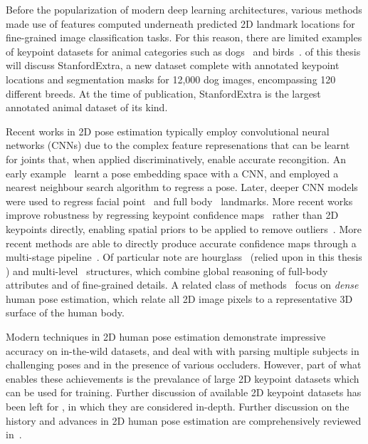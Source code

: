Before the popularization of modern deep learning architectures, various methods made use of features computed underneath predicted 2D landmark locations for fine-grained image classification tasks. For this reason, there are limited examples of keypoint datasets for animal categories such as dogs~\cite{liu2012dog} and birds~\cite{WelinderEtal2010}.  of this thesis will discuss StanfordExtra, a new dataset complete with annotated keypoint locations and segmentation masks for 12,000 dog images, encompassing 120 different breeds. At the time of publication, StanfordExtra is the largest annotated animal dataset of its kind. 

Recent works in 2D pose estimation typically employ convolutional neural networks (CNNs) due to the complex feature represenations that can be learnt for joints that, when applied discriminatively, enable accurate recongition. An early example~\cite{pose-embedding} learnt a pose embedding space with a CNN, and employed a nearest neighbour search algorithm to regress a pose. Later, deeper CNN models were used to regress facial point~\cite{pose-face-earlycnn} and full body~\cite{toshev2014deeppose} landmarks. More recent works improve robustness by regressing keypoint confidence maps~\cite{joint-training} rather than 2D keypoints directly, enabling spatial priors to be applied to remove outliers~\cite{cao2018openpose,Pfister15,Pfister14a,Charles16,joint-training,viewpoints-keypoints,pishchulin2016deepcut}. More recent methods are able to directly produce accurate confidence maps through a multi-stage pipeline~\cite{wei2016cpm}. Of particular note are hourglass~\cite{newell2016stacked} (relied upon in this thesis ) and multi-level~\cite{sun2019deep,Xiao_2018_ECCV} structures, which combine global reasoning of full-body attributes and of fine-grained details. A related class of methods~\cite{guler2018densepose, taylor2012vitruvian} focus on \emph{dense} human pose estimation, which relate all 2D image pixels to a representative 3D surface of the human body. 

Modern techniques in 2D human pose estimation demonstrate impressive accuracy on in-the-wild datasets, and deal with with parsing multiple subjects in challenging poses and in the presence of various occluders. However, part of what enables these achievements is the prevalance of large 2D keypoint datasets which can be used for training. Further discussion of available 2D keypoint datasets has been left for , in which they are considered in-depth. Further discussion on the history and advances in 2D human pose estimation are comprehensively reviewed in~\cite{2dpose-survey-1, 2dpose-survey-2}.

